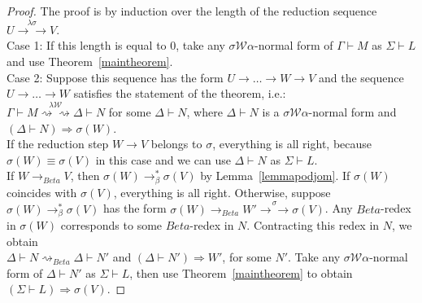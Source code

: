 \documentclass[11pt]{amsart}
\theoremstyle{plain}
\theoremstyle{definition}
\theoremstyle{remark}
\numberwithin{equation}{section}
\newcommand{\ri}{\rightsquigarrow}
\newcommand{\arrow}{\rightarrow}
\newcommand{\twoh}{\arrow\arrow}
\renewcommand{\pi}{\mathcal{W}}
\begin{document}
\begin{proof}The proof is by induction over the length of the reduction
sequence $U\overset{\lambda\sigma}{\twoh}V$. \\[5pt]
Case 1: If this length is equal to $0$, take any
$\sigma\pi\alpha$-normal form of $\Gamma\vdash M$ as $\Sigma\vdash
L$ and use Theorem~\ref{maintheorem}.
\\[5pt]
 Case 2: Suppose this sequence has the form
 $U\arrow \ldots\arrow W\arrow V$ and
   the sequence
 $U\arrow \ldots\arrow W$ satisfies the statement of the theorem, i.e.:\\
 $\Gamma\vdash M
\overset{\lambda\pi}{\ri\ri}\Delta\vdash N$ for some $\Delta\vdash
N$, where $\Delta\vdash N$  is
 a
$\sigma\pi\alpha$-normal form  and $(\Delta\vdash
N)\boldsymbol{\Rightarrow}\sigma(W)$.\\[3pt]
 If the reduction step $W\arrow
V$ belongs to  $\sigma$, everything is all right,
 because
$\sigma(W)\equiv\sigma(V)$ in this case and we can use
$\Delta\vdash N$ as $\Sigma\vdash L$.
\\[3pt] If
$W\arrow_{Beta}V$, then $\sigma(W)\arrow^*_{\beta}\sigma(V)$ by
Lemma~\ref{lemmapodjom}. If $\sigma(W)$ coincides with
$\sigma(V)$, everything is all right. Otherwise, suppose
$\sigma(W)\arrow^*_{\beta}\sigma(V)$ has the form
$\sigma(W)\arrow_{Beta}W'\overset{\sigma}{\twoh}\sigma(V)$.
 Any  $Beta$-redex in
$\sigma(W)$
corresponds to some $Beta$-redex in $N$. Contracting this redex in $N$, we obtain\\
$\Delta\vdash N\ri_{Beta}\Delta\vdash N'$ and $(\Delta\vdash
N')\boldsymbol{\Rightarrow}W'$, for some $N'$. Take  any
$\sigma\pi\alpha$-normal form of $\Delta\vdash N'$ as
$\Sigma\vdash L$, then use Theorem~\ref{maintheorem} to obtain\\
$(\Sigma\vdash L)\boldsymbol{\Rightarrow}\sigma(V)$.
\end{proof}
\newpage



\end{document}
